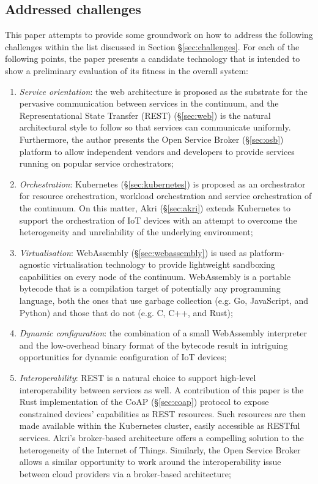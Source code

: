 \subsection{Addressed challenges}

This paper attempts to provide some groundwork on how to address the following challenges within the list discussed in Section §\ref{sec:challenges}. For each of the following points, the paper presents a candidate technology that is intended to show a preliminary evaluation of its fitness in the overall system:

\begin{enumerate}
    \item \emph{Service orientation}: the web architecture is proposed as the substrate for the pervasive communication between services in the continuum, and the Representational State Transfer (REST) (§\ref{sec:web}) is the natural architectural style to follow so that services can communicate uniformly. Furthermore, the author presents the Open Service Broker (§\ref{sec:osb}) platform to allow independent vendors and developers to provide services running on popular service orchestrators;
    \item \emph{Orchestration}: Kubernetes (§\ref{sec:kubernetes}) is proposed as an orchestrator for resource orchestration, workload orchestration and service orchestration of the continuum. On this matter, Akri (§\ref{sec:akri}) extends Kubernetes to support the orchestration of IoT devices with an attempt to overcome the heterogeneity and unreliability of the underlying environment;
    \item \emph{Virtualisation}: WebAssembly (§\ref{sec:webassembly}) is used as platform-agnostic virtualisation technology to provide lightweight sandboxing capabilities on every node of the continuum. WebAssembly is a portable bytecode that is a compilation target of potentially any programming language, both the ones that use garbage collection (e.g. Go, JavaScript, and Python) and those that do not (e.g. C, C++, and Rust);
    \item \emph{Dynamic configuration}: the combination of a small WebAssembly interpreter and the low-overhead binary format of the bytecode result in intriguing opportunities for dynamic configuration of IoT devices;
    \item \emph{Interoperability}: REST is a natural choice to support high-level interoperability between services as well. A contribution of this paper is the Rust implementation of the CoAP (§\ref{sec:coap}) protocol to expose constrained devices' capabilities as REST resources. Such resources are then made available within the Kubernetes cluster, easily accessible as RESTful services. Akri's broker-based architecture offers a compelling solution to the heterogeneity of the Internet of Things. Similarly, the Open Service Broker allows a similar opportunity to work around the interoperability issue between cloud providers via a broker-based architecture;

\end{enumerate}
